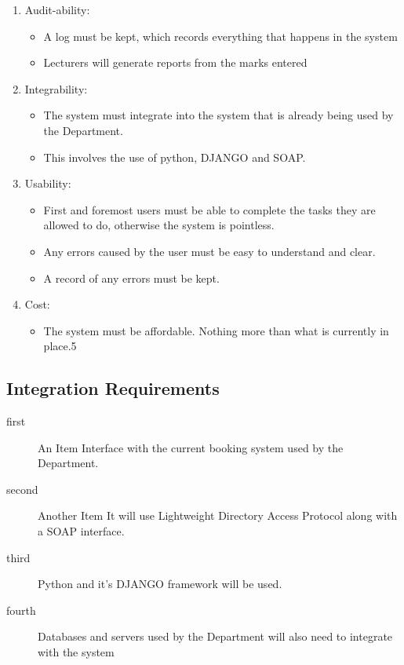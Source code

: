 \begin{enumerate}
\begin{itemize}
\end{itemize}
\item Audit-ability:
\begin{itemize}
\item A log must be kept, which records everything that happens in the system
\item Lecturers will generate reports from the marks entered
\end{itemize}
\item Integrability:
\begin{itemize}
\item The system must integrate into the system that is already being used by the Department.
\item This involves the use of python, DJANGO and SOAP.
\end{itemize}
\item Usability:
\begin{itemize}
\item First and foremost users must be able to complete the tasks they are allowed to do, otherwise the system is pointless.
\item Any errors caused by the user must be easy to understand and clear.
\item A record of any errors must be kept.
\end{itemize}
\item Cost:
\begin{itemize}
\item The system must be affordable. Nothing more than what is currently in place.5
\end{itemize}
\end{enumerate}

\subsection{Integration Requirements}

\begin{description}

\item[first]{An Item} Interface with the current booking system used by the Department.
\item[second]{Another Item} It will use Lightweight Directory Access Protocol along with a SOAP interface.
\item[third] Python and it's DJANGO framework will be used.
\item[fourth] Databases and servers used by the Department will also need to integrate with the system 

\end{description}

